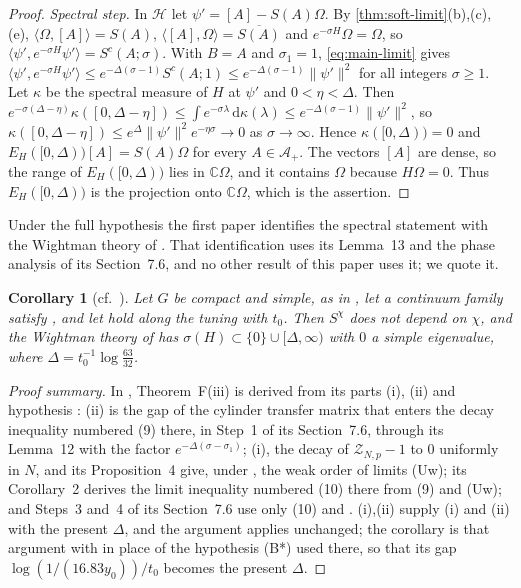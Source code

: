 \documentclass[11pt,a4paper]{amsart}
\newtheorem{corollary}[theorem]{Corollary}
\theoremstyle{definition}
\theoremstyle{remark}
\numberwithin{equation}{section}
\newcommand{\C}{\mathbb{C}}          %
\newcommand{\Hilb}{\mathcal{H}}      %
\newcommand{\ip}[2]{\langle #1,#2\rangle}  %
\newcommand{\norm}[1]{\lVert #1\rVert}     %
\newcommand{\dd}{\,\mathrm{d}}             %
\newcommand{\TT}{\mathbb{T}}               %
\newcommand{\Zc}{\mathcal{Z}}              %
\newcommand{\Mcirc}{\text{\upshape(M$^{\circ}$)}}   %
\newcommand{\hypW}{\text{\upshape(W)}}              %
\newcommand{\tzero}{t_0}                   %
\begin{document}
\begin{proof}
\emph{Spectral step.} In $\Hilb$ let $\psi'=[A]-S(A)\Omega$. By \cref{thm:soft-limit}(b),(c),(e), $\ip{\Omega}{[A]}=S(A)$, $\ip{[A]}{\Omega}=\overline{S(A)}$ and $e^{-\sigma H}\Omega=\Omega$, so $\ip{\psi'}{e^{-\sigma H}\psi'}=S^c(A;\sigma)$. With $B=A$ and $\sigma_1=1$, \eqref{eq:main-limit} gives $\ip{\psi'}{e^{-\sigma H}\psi'}\le e^{-\Delta(\sigma-1)}S^c(A;1)\le e^{-\Delta(\sigma-1)}\norm{\psi'}^2$ for all integers $\sigma\ge1$. Let $\kappa$ be the spectral measure of $H$ at $\psi'$ and $0<\eta<\Delta$. Then $e^{-\sigma(\Delta-\eta)}\kappa([0,\Delta-\eta])\le\int e^{-\sigma\lambda}\dd\kappa(\lambda)\le e^{-\Delta(\sigma-1)}\norm{\psi'}^2$, so $\kappa([0,\Delta-\eta])\le e^{\Delta}\norm{\psi'}^2e^{-\eta\sigma}\to0$ as $\sigma\to\infty$. Hence $\kappa([0,\Delta))=0$ and $E_H([0,\Delta))[A]=S(A)\Omega$ for every $A\in\mathcal A_+$. The vectors $[A]$ are dense, so the range of $E_H([0,\Delta))$ lies in $\C\Omega$, and it contains $\Omega$ because $H\Omega=0$. Thus $E_H([0,\Delta))$ is the projection onto $\C\Omega$, which is the assertion.
\end{proof}

Under the full hypothesis \hypW{} the first paper identifies the spectral statement with the Wightman theory of \hypW. That identification uses its Lemma~13 and the phase analysis of its Section~7.6, and no other result of this paper uses it; we quote it.

\begin{corollary}[{cf.\ \cite[Theorem~F(iii)]{bhattacharjee2026first}}]\label{cor:phase-form}
Let $G$ be compact and simple, as in \cite[Section~7]{bhattacharjee2026first}, let a continuum family satisfy \hypW, and let \Mcirc{} hold along the tuning with $\tzero$. Then $S^\chi$ does not depend on $\chi$, and the Wightman theory of \hypW{} has $\sigma(H)\subset\{0\}\cup[\Delta,\infty)$ with $0$ a simple eigenvalue, where $\Delta=\tzero^{-1}\log\frac{63}{32}$.
\end{corollary}

\begin{proof}[Proof summary]
In \cite{bhattacharjee2026first}, Theorem~F(iii) is derived from its parts (i), (ii) and hypothesis \hypW: (ii) is the gap of the cylinder transfer matrix that enters the decay inequality numbered (9) there, in Step~1 of its Section~7.6, through its Lemma~12 with the factor $e^{-\Delta(\sigma-\sigma_1)}$; (i), the decay of $\Zc_{N,p}-1$ to $0$ uniformly in $N$, and its Proposition~4 give, under \hypW, the weak order of limits (Uw); its Corollary~2 derives the limit inequality numbered (10) there from (9) and (Uw); and Steps~3 and~4 of its Section~7.6 use only (10) and \hypW. (i),(ii) supply (i) and (ii) with the present $\Delta$, and the argument applies unchanged; the corollary is that argument with \Mcirc{} in place of the hypothesis (B*) used there, so that its gap $\log(1/(16.83y_0))/t_0$ becomes the present $\Delta$.
\end{proof}
\end{document}
